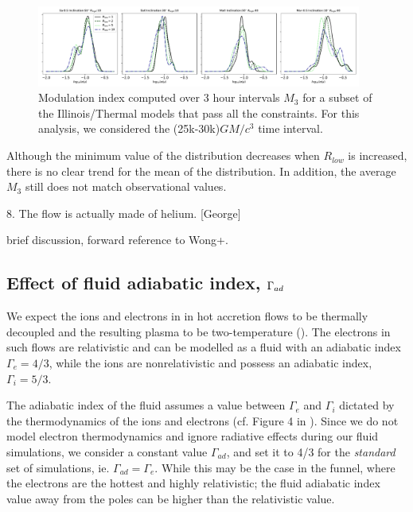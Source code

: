 \begin{figure}
\centering
\includegraphics[width=0.95\textwidth]{figures/mi_rlow_select_models.pdf}
\caption{Modulation index computed over 3 hour intervals $M_{3}$ for a subset of the Illinois/Thermal models that pass all the constraints. For this analysis, we considered the (25k-30k)$GM/c^{3}$ time interval.}
\label{fig:mi_rlow}
\end{figure}

Although the minimum value of the distribution decreases when $R_{low}$ is increased, there is no clear trend for the mean of the distribution. In addition, the average $M_{3}$ still does not match observational values.

8. The flow is actually made of helium. [George]

brief discussion, forward reference to Wong+.


\subsection{Effect of fluid adiabatic index, $\Gamma_{\lowercase{ad}}$}

We expect the ions and electrons in in hot accretion flows to be thermally decoupled and the resulting plasma to be two-temperature (\citealt{1976ApJ...204..187S, Quataert_1998, 10.1093/mnras/stw3116, Ryan_2018}). The electrons in such flows are relativistic and can be modelled as a fluid with an adiabatic index $\Gamma_{e}=4/3$, while the ions are nonrelativistic and possess an adiabatic index, $\Gamma_{i}=5/3$.

The adiabatic index of the fluid assumes a value between $\Gamma_{e}$ and $\Gamma_{i}$ dictated by the thermodynamics of the ions and electrons (cf. Figure 4 in \citealt{10.1093/mnras/stw3116}). Since we do not model electron thermodynamics and ignore radiative effects during our fluid simulations, we consider a constant value $\Gamma_{ad}$, and set it to 4/3 for the \textit{standard} set of simulations, ie. $\Gamma_{ad}=\Gamma_{e}$. While this may be the case in the funnel, where the electrons are the hottest and highly relativistic; the fluid adiabatic index value away from the poles can be higher than the relativistic value.

